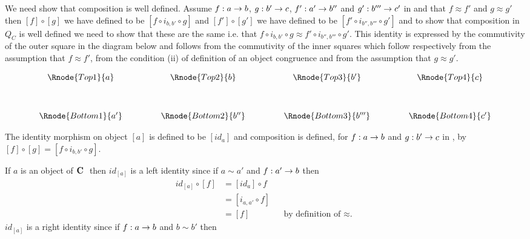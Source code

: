 \documentclass[10pt,a4paper]{scrartcl}
\begin{document}
We need show that composition is well defined.  Assume $f:a \rightarrow b$, $g: b' \rightarrow c$, $f':a' \rightarrow b''$ and $g': b''' \rightarrow c'$ in \catcw and that
$f \approx f'$ and $g \approx g'$ then 
$[f] \circ [g]$ we have defined to be $[f \circ i_{b,b'} \circ g]$  and $[f']  \circ [g']$ we have defined to be $[f' \circ i_{b'',b'''} \circ g']$
and to show that composition in $Q_C$ is well defined we need to show that these are the same i.e. that $f \circ i_{b,b'} \circ g \approx f' \circ i_{b'',b'''} \circ g'$. This identity
is expressed by the commutivity of the outer square in the diagram below and follows from the commutivity of the inner squares which follow respectively from the assumption that $f \approx f'$,
from the condition (ii) of definition of an object congruence and from the assumption that $g \approx g'$.

\vspace{3mm}
\begin{center}
\begin{displaymath}
\begin{array}{cp{.9cm}cp{.9cm}cp{.9cm}c}
\Rnode{Top1}{a} & & \Rnode{Top2}{b}  & & \Rnode{Top3}{b'} && \Rnode{Top4}{c}\\ [1.2cm]
\Rnode{Bottom1}{a'} & & \Rnode{Bottom2}{b''}  & & \Rnode{Bottom3}{b'''} && \Rnode{Bottom4}{c'}
\end{array}
\end{displaymath}
\end{center}


The identity morphism on object $[a]$ is defined to be $[id_a]$
and composition  is defined,  for
 $f:a \rightarrow b$ and $g: b' \rightarrow c$ in \catcw, by $[f] \circ [g]=[f \circ i_{b,b'} \circ g]$.

If $a$ is an object of $\textbf{C}\ $ then $id_{[a]}$ is a left identity since if  $a \sim a'$ and $f:a' \rightarrow b$ then 
\begin{align*}
id_{[a]} \circ [f] & = [id_a] \circ f                                             \\
                 &= [i_{a,a'} \circ f]                                            \\
                 &= [f]                & &\mbox {by definition of $\approx$. }
\end{align*}
$id_{[a]}$ is a right identity since if $f:a \rightarrow b$ and $b \sim b'$  then
\end{document}
